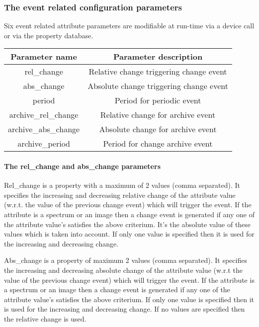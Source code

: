 \subsubsection{The event related configuration parameters}

Six event related attribute parameters are modifiable
at run-time via a device call or via the property database.

\vspace{0.3cm}

\begin{center}
\begin{longtable}{|c|c|}
\hline 
Parameter name & Parameter description\tabularnewline
\hline 
\hline 
rel\_change & Relative change triggering change event\tabularnewline
\hline 
abs\_change & Absolute change triggering change event\tabularnewline
\hline 
\hline 
period  & Period for periodic event\tabularnewline
\hline 
\hline 
archive\_rel\_change  & Relative change for archive event\tabularnewline
\hline 
archive\_abs\_change & Absolute change for archive event\tabularnewline
\hline 
archive\_period  & Period for change archive event\tabularnewline
\hline 
\end{longtable}
\par\end{center}

\vspace{0.3cm}


\paragraph{The rel\_change and abs\_change parameters}

Rel\_change is a property with a maximum of 2 values
(comma separated). It specifies the increasing and decreasing relative
change of the attribute value (w.r.t. the value of the previous change
event) which will trigger the event. If the attribute is a spectrum
or an image then a change event is generated if any one of the attribute
value's satisfies the above criterium. It's the absolute value of
these values which is taken into account. If only one value is specified
then it is used for the increasing and decreasing change.

Abs\_change is a property of maximum 2 values (comma
separated). It specifies the increasing and decreasing absolute change
of the attribute value (w.r.t the value of the previous change event)
which will trigger the event. If the attribute is a spectrum or an
image then a change event is generated if any one of the attribute
value's satisfies the above criterium. If only one value is specified
then it is used for the increasing and decreasing change. If no values
are specified then the relative change is used.

